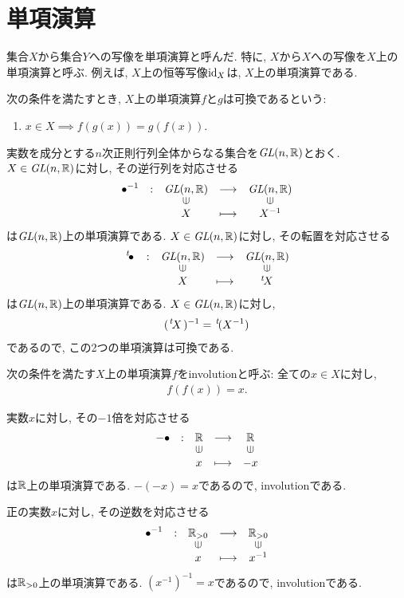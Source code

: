 \section{単項演算}
集合$X$から集合$Y$への写像を単項演算と呼んだ.
特に, $X$から$X$への写像を$X$上の単項演算と呼ぶ.
例えば, $X$上の恒等写像$\operatorname{id}_X$は, $X$上の単項演算である.
\begin{definition}
  次の条件を満たすとき,
  $X$上の単項演算$f$と$g$は可換であるという:
  \begin{enumerate}
  \item $x\in X \implies f(g(x))=g(f(x))$.
  \end{enumerate}
\end{definition}
\begin{example}
  実数を成分とする$n$次正則行列全体からなる集合を$\textit{GL}(n,\mathbb{R})$とおく.
  $X\in \textit{GL}(n,\mathbb{R})$に対し, その逆行列を対応させる
  \begin{align*}
    \shazo{\bullet^{-1}}
          {\GL(n,\RR)}{\GL(n,\RR)}
          {X}{X^{-1}}
  \end{align*}
  は$\textit{GL}(n,\mathbb{R})$上の単項演算である.
  $X\in \textit{GL}(n,\mathbb{R})$に対し, その転置を対応させる
  \begin{align*}
    \shazo{\transposed{\bullet}}
          {\GL(n,\RR)}{\GL(n,\RR)}
          {X}{\transposed{X}}
  \end{align*}
  は$\textit{GL}(n,\mathbb{R})$上の単項演算である.
  $X\in \textit{GL}(n,\mathbb{R})$に対し,
  \begin{align*}
    (\left.^{t}\!X\right.)^{-1}=\left.^{t}\!(X^{-1})\right.
  \end{align*}
  であるので, この2つの単項演算は可換である.
\end{example}
\begin{definition}
  次の条件を満たす$X$上の単項演算$f$をinvolutionと呼ぶ:
  全ての$x\in X$に対し,
  \begin{align*}
    f(f(x))=x.
  \end{align*}
\end{definition}
\begin{example}
  実数$x$に対し, その$-1$倍を対応させる
  \begin{align*}
    \shazo{-\bullet}
          {\RR}{\RR}
          {x}{-x}
  \end{align*}
  は$\mathbb{R}$上の単項演算である.
  $-(-x)=x$であるので,
  involutionである.
\end{example}
\begin{example}
  正の実数$x$に対し, その逆数を対応させる
  \begin{align*}
    \shazo{\bullet^{-1}}
          {\RR_{>0}}{\RR_{>0}}
          {x}{x^{-1}}
  \end{align*}
  は$\mathbb{R}_{>0}$上の単項演算である.
  $(x^{-1})^{-1}=x$であるので,
  involutionである.
\end{example}
